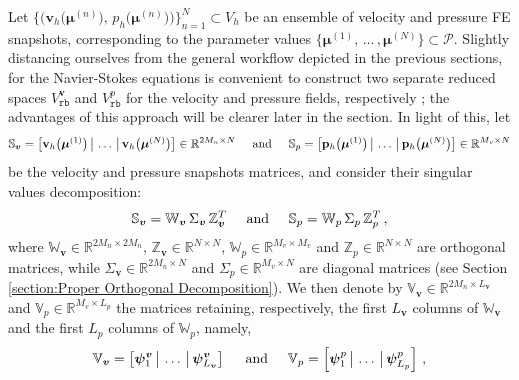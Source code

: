 \documentclass[12pt, a4paper, twoside, openright, notitlepage]{report}
\numberwithin{equation}{chapter}
\theoremstyle{theorem}
\theoremstyle{definition}
\theoremstyle{remark}
\theoremstyle{proposition}
\numberwithin{figure}{chapter}
\newcommand{\bg}[1]{\boldsymbol{#1}}
\begin{document}
		Let $\big\lbrace \big( \bg{v}_h \big( \bg{\mu}^{(n)} \big), \, p_h \big( \bg{\mu}^{(n)} \big) \big) \big\rbrace_{n = 1}^N \subset V_h$ be an ensemble of velocity and pressure FE snapshots, corresponding to the parameter values $\big\lbrace \bg{\mu}^{(1)}, \, \ldots \, , \bg{\mu}^{(N)} \big\rbrace \subset \mathcal{P}$. Slightly distancing ourselves from the general workflow depicted in the previous sections, for the Navier-Stokes equations is convenient to construct two separate reduced spaces $V_{\texttt{rb}}^{\bg{v}}$ and $V_{\texttt{rb}}^{p}$ for the velocity and pressure fields, respectively \cite{Bal14, Bur06, Chen17, QMN15}; the advantages of this approach will be clearer later in the section. In light of this, let 
		\begin{equation*}
			\mathbb{S}_{\bg{v}} = \big[ \mathbf{v}_h \big( \bg{\mu}^{(1)} \big) \, \big| \, \ldots \, \big| \, \mathbf{v}_h \big( \bg{\mu}^{(N)} \big) \big] \in \mathbb{R}^{2 M_n \times N} \hspace*{0.5cm} \text{and} \hspace*{0.5cm} \mathbb{S}_{p} = \big[ \mathbf{p}_h \big( \bg{\mu}^{(1)} \big) \, \big| \, \ldots \, \big| \, \mathbf{p}_h \big( \bg{\mu}^{(N)} \big) \big] \in \mathbb{R}^{M_v \times N}
		\end{equation*}
		be the velocity and pressure snapshots matrices, and consider their singular values decomposition:
		\begin{equation*}
			\mathbb{S}_{\bg{v}} = \mathbb{W}_{\bg{v}} \, \Sigma_{\bg{v}} \, \mathbb{Z}_{\bg{v}}^T \hspace*{0.5cm} \text{and} \hspace*{0.5cm} \mathbb{S}_{p} = \mathbb{W}_{p} \, \Sigma_{p} \, \mathbb{Z}_{p}^T \, ,
		\end{equation*}
		where $\mathbb{W}_{\bg{v}} \in \mathbb{R}^{2 M_n \times 2 M_n}$, $\mathbb{Z}_{\bg{v}} \in \mathbb{R}^{N \times N}$, $\mathbb{W}_{p} \in \mathbb{R}^{M_v \times M_v}$ and $\mathbb{Z}_{p} \in \mathbb{R}^{N \times N}$ are orthogonal matrices, while $\Sigma_{\bg{v}} \in \mathbb{R}^{2 M_n \times N}$ and $\Sigma_{p} \in \mathbb{R}^{M_v \times N}$ are diagonal matrices (see Section \ref{section:Proper Orthogonal Decomposition}). We then denote by $\mathbb{V}_{\bg{v}} \in \mathbb{R}^{2 M_n \times L_{\bg{v}}}$ and $\mathbb{V}_{p} \in \mathbb{R}^{M_v \times L_p}$ the matrices retaining, respectively, the first $L_{\bg{v}}$ columns of $\mathbb{W}_{\bg{v}}$ and the first $L_p$ columns of $\mathbb{W}_p$, namely,
		\begin{equation*}
			\mathbb{V}_{\bg{v}} = \left[ \bg{\psi}_1^{\bg{v}} \, \big| \, \ldots \, \big| \, \bg{\psi}_{L_{\bg{v}}}^{\bg{v}} \right] \hspace*{0.5cm} \text{and} \hspace*{0.5cm} \mathbb{V}_{p} = \left[ \bg{\psi}_1^{p} \, \big| \, \ldots \, \big| \, \bg{\psi}_{L_{p}}^{p} \right] \, ,
		\end{equation*}
\end{document}
